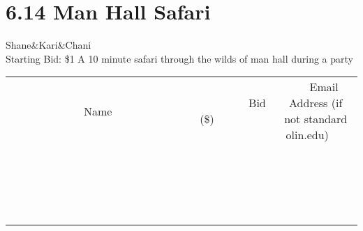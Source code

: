 \documentclass[11pt]{article}
\begin{document}
\section*{6.14 Man Hall Safari}
Shane\&Kari\&Chani
\\
Starting Bid: \$1
\newline
 A 10 minute safari through the wilds of man hall during a party
\\[3ex]
\begin{tabular}{c c c}
~~~~~~~~~~~~~Name~~~~~~~~~~~~~ & ~~~~~~~~~Bid (\$)~~~~~~~~~  & ~~~Email Address (if not standard olin.edu)~~~\\
 & & \\
\hline
 & & \\
\hline
 & & \\
\hline
 & & \\
\hline
 & & \\
\hline
 & & \\
\hline
 & & \\
\hline
 & & \\
\hline
 & & \\
\hline
 & & \\
\hline
 & & \\
\hline
 & & \\
\hline
 & & \\
\hline
 & & \\
\hline
 & & \\
\hline
 & & \\
\hline
 & & \\
\hline
 & & \\
\hline
 & & \\
\hline
\end{tabular}
\newpage
\end{document}
